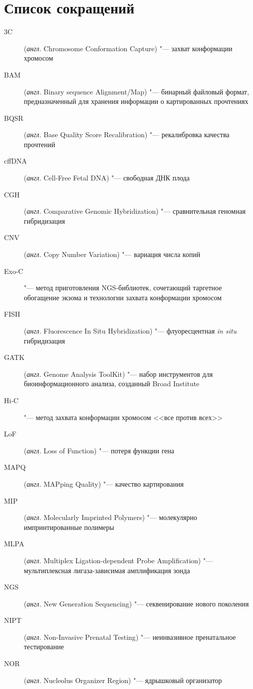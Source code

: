 \documentclass[a4paper,14pt]{extarticle}
\newcommand{\anglia}[1]{\textit{англ.} \textenglish{#1}}
\begin{document}
\tableofcontents

\newpage

\section*{Список сокращений}

\begin{description}
\item[3C] (\anglia{Chromosome Conformation Capture}) "--- захват конформации хромосом
\item[BAM] (\anglia{Binary sequence Alignment/Map}) "--- бинарный файловый формат, предназначенный для хранения информации о картированных прочтениях
\item[BQSR] (\anglia{Base Quality Score Recalibration}) "--- рекалибровка качества прочтений
\item[cffDNA] (\anglia{Cell-Free Fetal DNA}) "--- свободная ДНК плода
\item[CGH] (\anglia{Comparative Genomic Hybridization}) "--- сравнительная геномная гибридизация
\item[CNV] (\anglia{Copy Number Variation}) "--- вариация числа копий
\item[Exo-C] "--- метод приготовления NGS\hyp{}библиотек, сочетающий таргетное обогащение экзома и технологии захвата конформации хромосом
\item[FISH] (\anglia{Fluorescence In Situ Hybridization}) "--- флуоресцентная \textit{in situ} гибридизация
\item[GATK] (\anglia{Genome Analysis ToolKit}) "--- набор инструментов для биоинформационного анализа, созданный Broad Institute
\item[Hi-C] "--- метод захвата конформации хромосом <<все против всех>>
\item[LoF] (\anglia{Loss of Function}) "--- потеря функции гена
\item[MAPQ] (\anglia{MAPping Quality}) "--- качество картирования
\item[MIP] (\anglia{Molecularly Imprinted Polymers}) "--- молекулярно импринтированные полимеры
\item[MLPA] (\anglia{Multiplex Ligation-dependent Probe Amplification}) "--- мультиплексная лигаза-зависимая амплификация зонда
\item[NGS] (\anglia{New Generation Sequencing}) "--- секвенирование нового поколения
\item[NIPT] (\anglia{Non-Invasive Prenatal Testing}) "--- неинвазивное пренатальное тестирование
\item[NOR] (\anglia{Nucleolus Organizer Region}) "--- ядрышковый организатор

\end{description}
\end{document}
